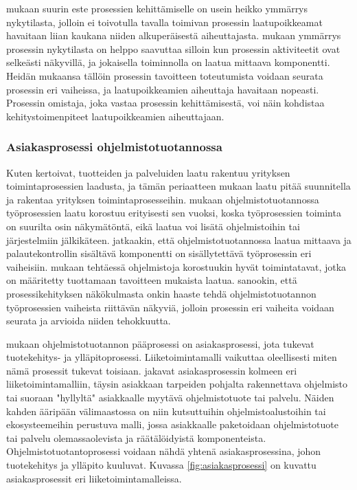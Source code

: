\documentclass[finnish,12pt,a4paper,pdftex]{article}
\begin{document}
\cite{teollisuustalous} mukaan suurin este prosessien kehittämiselle on usein heikko ymmärrys nykytilasta, jolloin ei toivotulla tavalla toimivan prosessin laatupoikkeamat havaitaan liian kaukana niiden alkuperäisestä aiheuttajasta. \cite{ohjelmistotuotanto} mukaan ymmärrys prosessin nykytilasta on helppo saavuttaa silloin kun prosessin aktiviteetit ovat selkeästi näkyvillä, ja jokaisella toiminnolla on laatua mittaava komponentti. Heidän mukaansa tällöin prosessin tavoitteen toteutumista voidaan seurata prosessin eri vaiheissa, ja laatupoikkeamien aiheuttaja havaitaan nopeasti. Prosessin omistaja, joka vastaa prosessin kehittämisestä, voi näin kohdistaa kehitystoimenpiteet laatupoikkeamien aiheuttajaan. 

\subsubsection{Asiakasprosessi ohjelmistotuotannossa}

Kuten \cite{teollisuustalous} kertoivat, tuotteiden ja palveluiden laatu rakentuu yrityksen toimintaprosessien laadusta, ja tämän periaatteen mukaan laatu pitää suunnitella ja rakentaa yrityksen toimintaprosesseihin. \cite{ohjelmistotuotanto, devops} mukaan ohjelmistotuotannossa työprosessien laatu korostuu erityisesti sen vuoksi, koska työprosessien toiminta on suurilta osin näkymätöntä, eikä laatua voi lisätä ohjelmistoihin tai järjestelmiin jälkikäteen. \citeauthor{devops} jatkaakin, että ohjelmistotuotannossa laatua mittaava ja palautekontrollin sisältävä komponentti on sisällytettävä työprosessin eri vaiheisiin. \cite{okaytannot} mukaan tehtäessä ohjelmistoja korostuukin hyvät toimintatavat, jotka on määritetty tuottamaan tavoitteen mukaista laatua. \cite{ohjelmistotuotanto} sanookin, että prosessikehityksen näkökulmasta onkin haaste tehdä ohjelmistotuotannon työprosessien vaiheista riittävän näkyviä, jolloin prosessin eri vaiheita voidaan seurata ja arvioida niiden tehokkuutta.

\cite{ohjelmistotuotanto} mukaan ohjelmistotuotannon pääprosessi on asiakasprosessi, jota tukevat tuotekehitys- ja ylläpitoprosessi. Liiketoimintamalli vaikuttaa oleellisesti miten nämä prosessit tukevat toisiaan. \citeauthor{ohjelmistotuotanto} jakavat asiakasprosessin kolmeen eri liiketoimintamalliin, täysin asiakkaan tarpeiden pohjalta rakennettava ohjelmisto tai suoraan "hyllyltä" asiakkaalle myytävä ohjelmistotuote tai palvelu. Näiden kahden ääripään välimaastossa on niin kutsuttuihin ohjelmistoalustoihin tai ekosysteemeihin perustuva malli, jossa asiakkaalle paketoidaan ohjelmistotuote tai palvelu olemassaolevista ja räätälöidyistä komponenteista. Ohjelmistotuotantoprosessi voidaan nähdä yhtenä asiakasprosessina, johon tuotekehitys ja ylläpito kuuluvat. Kuvassa \ref{fig:asiakasprosessi} on kuvattu asiakasprosessit eri liiketoimintamalleissa.
\end{document}
